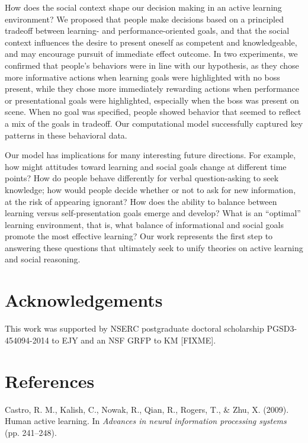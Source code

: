 \documentclass[10pt, letterpaper]{article}
\begin{document}
How does the social context shape our decision making in an active
learning environment? We proposed that people make decisions based on a
principled tradeoff between learning- and performance-oriented goals,
and that the social context influences the desire to present oneself as
competent and knowledgeable, and may encourage pursuit of immediate
effect outcome. In two experiments, we confirmed that people's behaviors
were in line with our hypothesis, as they chose more informative actions
when learning goals were highlighted with no boss present, while they
chose more immediately rewarding actions when performance or
presentational goals were highlighted, especially when the boss was
present on scene. When no goal was specified, people showed behavior
that seemed to reflect a mix of the goals in tradeoff. Our computational
model successfully captured key patterns in these behavioral data.

Our model has implications for many interesting future directions. For
example, how might attitudes toward learning and social goals change at
different time points? How do people behave differently for verbal
question-asking to seek knowledge; how would people decide whether or
not to ask for new information, at the risk of appearing ignorant? How
does the ability to balance between learning versus self-presentation
goals emerge and develop? What is an ``optimal'' learning environment,
that is, what balance of informational and social goals promote the most
effective learning? Our work represents the first step to answering
these questions that ultimately seek to unify theories on active
learning and social reasoning.

\section{Acknowledgements}\label{acknowledgements}

This work was supported by NSERC postgraduate doctoral scholarship
PGSD3-454094-2014 to EJY and an NSF GRFP to KM {[}FIXME{]}.

\section{References}\label{references}

\setlength{\parindent}{-0.1in} \setlength{\leftskip}{0.125in} \noindent

\hypertarget{refs}{}
\hypertarget{ref-castro2009human}{}
Castro, R. M., Kalish, C., Nowak, R., Qian, R., Rogers, T., \& Zhu, X.
(2009). Human active learning. In \emph{Advances in neural information
processing systems} (pp. 241--248).
\end{document}
